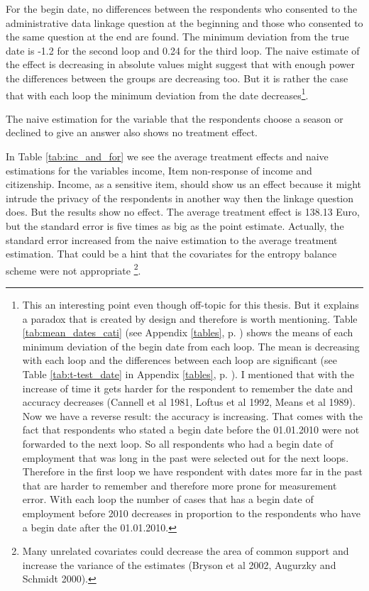 For the begin date, no differences between the respondents who consented to the administrative data linkage question at the beginning and those who consented to the same question at the end are found. The minimum deviation from the true date is -1.2 for the second loop and 0.24 for the third loop. The naive estimate of the effect is decreasing in absolute values might suggest that with enough power the differences between the groups are decreasing too. But it is rather the case that with each loop the minimum deviation from the date decreases\footnote{This an interesting point even though off-topic for this thesis. But it explains a paradox that is created by design and therefore is worth mentioning. Table \ref{tab:mean_dates_cati} (see Appendix \ref{tables}, p. \pageref{tab:mean_dates_cati}) shows the means of each minimum deviation of the begin date from each loop. The mean is decreasing with each loop and the differences between each loop are significant (see Table \ref{tab:t-test_date} in Appendix \ref{tables}, p. \pageref{tab:t-test_date}). I mentioned that with the increase of time it gets harder for the respondent to remember the date and accuracy decreases (Cannell et al 1981, Loftus et al 1992, Means et al 1989). Now we have a reverse result: the accuracy is increasing. That comes with the fact that respondents who stated a begin date before the 01.01.2010 were not forwarded to the next loop. So all respondents who had a begin date of employment that was long in the past were selected out for the next loops. Therefore in the first loop we have respondent with dates more far in the past that are harder to remember and therefore more prone for measurement error. With each loop the number of cases that  has a begin date of employment before 2010 decreases in proportion to the respondents who have a begin date after the 01.01.2010.}.  

The naive estimation for the variable that the respondents choose a season or declined to give an answer also shows no treatment effect.

In Table \ref{tab:inc_and_for} we see the average treatment effects and naive estimations for the variables income, Item non-response of income and citizenship. Income, as a sensitive item, should show us an effect because it might intrude the privacy of the respondents in another way then the linkage question does. But the results show no effect. The average treatment effect is 138.13 Euro, but the standard error is five times as big as the point estimate. Actually, the standard error increased from the naive estimation to the average treatment estimation. That could be a hint that the covariates for the entropy balance scheme were not appropriate \footnote{Many unrelated covariates could decrease the area of common support and increase the variance of the estimates (Bryson et al 2002, Augurzky and Schmidt 2000).}. 

